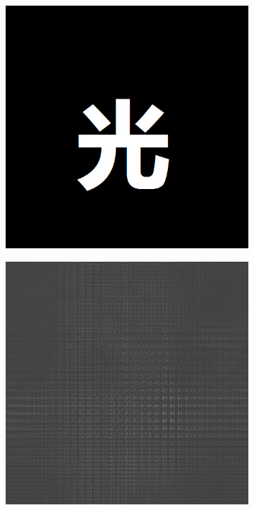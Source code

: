 \documentclass{ctexart}
\begin{document}
\begin{figure}[H]
  \centering
  \begin{subfigure}{.32\textwidth}
    \includegraphics[width=\linewidth]{数字全息实验数据/计算机模拟全息/全息样品图片/3-光.jpg}
  \end{subfigure}
  \begin{subfigure}{.32\textwidth}
    \includegraphics[width=\linewidth]{数字全息实验数据/计算机模拟全息/用软件模拟得到的全息图/3-光-全息图.jpg}

\end{subfigure}
\end{figure}
\end{document}
